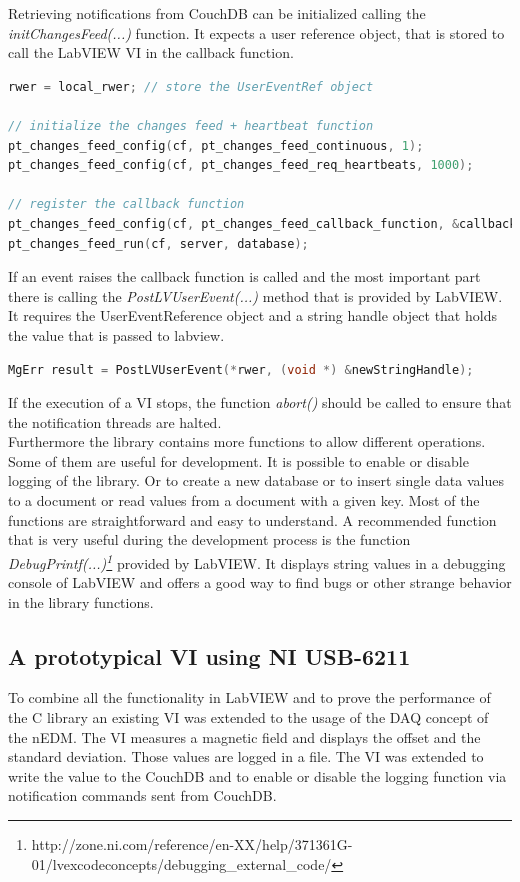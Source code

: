 Retrieving notifications from CouchDB can be initialized calling the \textit{initChangesFeed(...)} function. It expects a user reference object, that is stored to call the LabVIEW VI in the callback function.

\begin{lstlisting}[language=C++]
rwer = local_rwer; // store the UserEventRef object

// initialize the changes feed + heartbeat function 
pt_changes_feed_config(cf, pt_changes_feed_continuous, 1);
pt_changes_feed_config(cf, pt_changes_feed_req_heartbeats, 1000);

// register the callback function
pt_changes_feed_config(cf, pt_changes_feed_callback_function, &callback);
pt_changes_feed_run(cf, server, database);
\end{lstlisting}

If an event raises the callback function is called and the most important part there is calling the \textit{PostLVUserEvent(...)} method that is provided by LabVIEW. It requires the UserEventReference object and a string handle object that holds the value that is passed to labview.

\begin{lstlisting}[language=C++]
MgErr result = PostLVUserEvent(*rwer, (void *) &newStringHandle);
\end{lstlisting}

If the execution of a VI stops, the function \textit{abort()} should be called to ensure that the notification threads are halted.\\

Furthermore the library contains more functions to allow different operations. Some of them are useful for development. It is possible to enable or disable logging of the library. Or to create a new database or to insert single data values to a document or read values from a document with a given key. Most of the functions are straightforward and easy to understand. A recommended function that is very useful during the development process is the function \textit{DebugPrintf(...)\footnote{http://zone.ni.com/reference/en-XX/help/371361G-01/lvexcodeconcepts/debugging\_external\_code/}} provided by LabVIEW. It displays string values in a debugging console of LabVIEW and offers a good way to find bugs or other strange behavior in the library functions.

\subsection{A prototypical VI using NI USB-6211}
To combine all the functionality in LabVIEW and to prove the performance of the C library an existing VI was extended to the usage of the DAQ concept of the nEDM. The VI measures a magnetic field and displays the offset and the standard deviation. Those values are logged in a file. The VI was extended to write the value to the CouchDB and to enable or disable the logging function via notification commands sent from CouchDB. \\

